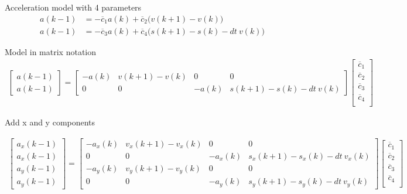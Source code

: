 \documentclass[10pt]{article}         %
\begin{document}
Acceleration model with 4 parameters
\begin{align}
a(k-1) &= - \overline c_1 a(k)  + \overline c_2 \bigl( v(k+1) - v(k) \bigr) \\
a(k-1) &= - \overline c_3 a(k)  + \overline c_4 \bigl( s(k+1) - s(k) - dt \  v(k)\bigr)
\end{align}

Model in matrix notation
\begin{align}
    \begin{bmatrix}
        a(k-1) \\ a(k-1)       
    \end{bmatrix}
    =
    \begin{bmatrix}
         -a(k)  & v(k+1) - v(k)  & 0 & 0 \\
         0 & 0 & -a(k) &    s(k+1) - s(k) - dt \  v(k)
        \end{bmatrix}
        \begin{bmatrix}
        \overline c_1 \\
        \overline c_2 \\
        \overline c_3 \\
        \overline c_4 \\
    \end{bmatrix}
\end{align}

Add x and y components

\begin{align}
    \begin{bmatrix}
        a_x(k-1) \\ 
        a_x(k-1) \\ 
        a_y(k-1) \\ 
        a_y(k-1)       
    \end{bmatrix}
    =
    \begin{bmatrix}
        -a_x(k)  & v_x(k+1) - v_x(k)  & 0 & 0                   \\ 
        0 & 0 & -a_x(k) &    s_x(k+1) - s_x(k) - dt \  v_x(k)   \\ 
        -a_y(k)  & v_y(k+1) - v_y(k)  & 0 & 0                   \\
        0 & 0 & -a_y(k) &    s_y(k+1) - s_y(k) - dt \  v_y(k)
    \end{bmatrix}
    \begin{bmatrix}
        \overline c_1 \\
        \overline c_2 \\
        \overline c_3 \\
        \overline c_4 \\
   \end{bmatrix}
\end{align}
\end{document}
